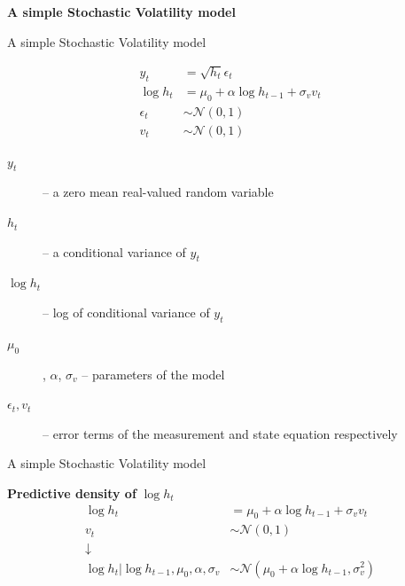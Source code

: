 \documentclass[notes,blackandwhite,mathsans,usenames,dvipsnames]{beamer}
\begin{document}
{\begin{frame}
\end{frame}







\begin{frame}

\begin{adjustwidth}{-0.5cm}{0cm}
\vspace{8.3cm}\Large
\textbf{{\color{mcxs2}A simple} {\color{purple}Stochastic Volatility} {\color{mcxs2} model}}
\end{adjustwidth}

\end{frame}
}


\begin{frame}{A simple Stochastic Volatility model}

\begin{align*}
y_t &= \sqrt{h_t} \epsilon_t\\[1ex]
\log h_t &= \mu_0 + \alpha\log h_{t-1} + \sigma_v v_t\\[1ex]
\epsilon_t &\sim\mathcal{N}(0,1)\\[1ex]
v_t &\sim\mathcal{N}(0,1)
\end{align*}

\begin{description}
\item[$y_t$] {\color{mcxs2}-- a zero mean real-valued random variable}
\item[$h_t$] {\color{mcxs2}-- a conditional variance of} $y_t$
\item[$\log h_t$] {\color{mcxs2}-- log of conditional variance of} $y_t$
\item[$\mu_0$], $\alpha$, $\sigma_v$ {\color{mcxs2}-- parameters of the model}
\item[$\epsilon_t, v_t$] {\color{mcxs2}-- error terms of the measurement and state equation respectively}
\end{description}
\end{frame}




\begin{frame}{A simple Stochastic Volatility model}

\textbf{Predictive density of} $\log h_t$
\begin{align*}
\log h_t &= \mu_0 + \alpha\log h_{t-1} + \sigma_v v_t\\
v_t &\sim\mathcal{N}(0,1)\\
\downarrow&\\
\log h_t|\log h_{t-1}, \mu_0, \alpha, \sigma_v &\sim\mathcal{N}(\mu_0 + \alpha\log h_{t-1}, \sigma_v^2)
\end{align*}

\end{frame}
\end{document}
